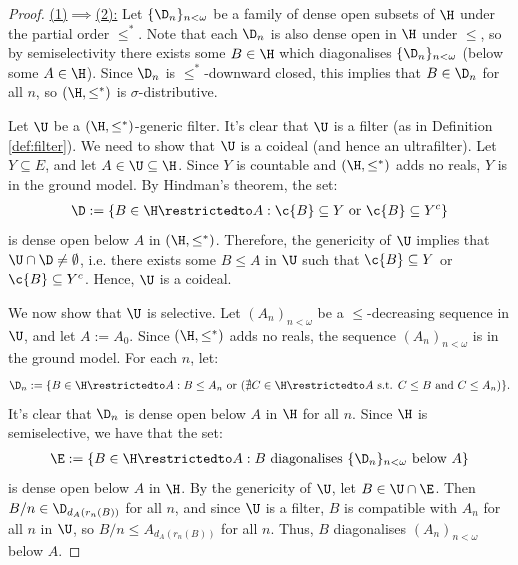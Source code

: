 \documentclass[11pt,reqno]{amsart}
\begin{document}
\begin{proof}
    \underline{(1)$\implies$(2):} Let $\{\D_n\}_{n<\omega}$ be a family of dense open subsets of $\H$ under the partial order $\leq^*$. Note that each $\D_n$ is also dense open in $\H$ under $\leq$, so by semiselectivity there exists some $B \in \H$ which diagonalises $\{\D_n\}_{n<\omega}$ (below some $A \in \H$). Since $\D_n$ is $\leq^*$-downward closed, this implies that $B \in \D_n$ for all $n$, so $(\H,\leq^*)$ is $\sigma$-distributive.

    Let $\U$ be a $(\H,\leq^*)$-generic filter. It's clear that $\U$ is a filter (as in Definition \ref{def:filter}). We need to show that $\U$ is a coideal (and hence an ultrafilter). Let $Y \subseteq E$, and let $A \in \U \subseteq \H$. Since $Y$ is countable and $(\H,\leq^*)$ adds no reals, $Y$ is in the ground model. By Hindman's theorem, the set:
    \begin{align*}
        \D := \{B \in \H\restrictedto A : \c{B} \subseteq Y \text{ or } \c{B} \subseteq Y^c\}
    \end{align*}
    is dense open below $A$ in $(\H,\leq^*)$. Therefore, the genericity of $\U$ implies that $\U \cap \D \neq \emptyset$, i.e. there exists some $B \leq A$ in $\U$ such that $\c{B} \subseteq Y$ or $\c{B} \subseteq Y^c$. Hence, $\U$ is a coideal.

    We now show that $\U$ is selective. Let $(A_n)_{n<\omega}$ be a $\leq$-decreasing sequence in $\U$, and let $A := A_0$. Since $(\H,\leq^*)$ adds no reals, the sequence $(A_n)_{n<\omega}$ is in the ground model. For each $n$, let:
    \begin{align*}
        \D_n := \{B \in \H\restrictedto A : B \leq A_n \text{ or } (\nexists C \in \H\restrictedto A \text{ s.t. } C \leq B \text{ and } C \leq A_n)\}.
    \end{align*}
    It's clear that $\D_n$ is dense open below $A$ in $\H$ for all $n$. Since $\H$ is semiselective, we have that the set:
    \begin{align*}
        \E := \{B \in \H\restrictedto A : \text{$B$ diagonalises $\{\D_n\}_{n<\omega}$ below $A$}\}
    \end{align*}
    is dense open below $A$ in $\H$. By the genericity of $\U$, let $B \in \U \cap \E$. Then $B/n \in \D_{d_A(r_n(B))}$ for all $n$, and since $\U$ is a filter, $B$ is compatible with $A_n$ for all $n$ in $\U$, so $B/n \leq A_{d_A(r_n(B))}$ for all $n$. Thus, $B$ diagonalises $(A_n)_{n<\omega}$ below $A$.


\end{proof}
\end{document}
